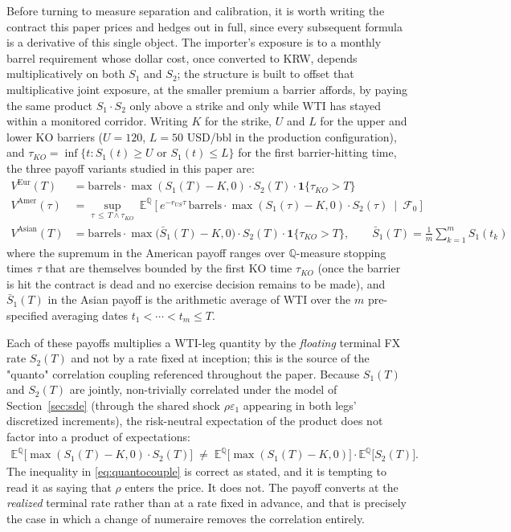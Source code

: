 \documentclass[11pt,a4paper]{article}
\begin{document}
Before turning to measure separation and calibration, it is worth writing the contract this paper prices and hedges out in full, since every subsequent formula is a derivative of this single object. The importer's exposure is to a monthly barrel requirement whose dollar cost, once converted to KRW, depends multiplicatively on both $S_1$ and $S_2$; the structure is built to offset that multiplicative joint exposure, at the smaller premium a barrier affords, by paying the same product $S_1 \cdot S_2$ only above a strike and only while WTI has stayed within a monitored corridor. Writing $K$ for the strike, $U$ and $L$ for the upper and lower KO barriers ($U=120$, $L=50$ USD/bbl in the production configuration), and $\tau_{KO}=\inf\{t : S_1(t)\ge U \text{ or } S_1(t)\le L\}$ for the first barrier-hitting time, the three payoff variants studied in this paper are:
\begin{align}
V^{\text{Eur}}(T) &= \mathrm{barrels}\cdot \max(S_1(T)-K,0)\cdot S_2(T)\cdot\mathbf 1\{\tau_{KO}>T\} \\
V^{\text{Amer}}(\tau) &= \sup_{\tau\,\le\, T\wedge\tau_{KO}}\ \mathbb E^{\mathbb Q}\!\left[e^{-r_{US}\tau}\,\mathrm{barrels}\cdot\max(S_1(\tau)-K,0)\cdot S_2(\tau)\ \middle|\ \mathcal F_0\right] \\
V^{\text{Asian}}(T) &= \mathrm{barrels}\cdot \max\!\big(\bar S_1(T)-K,0\big)\cdot S_2(T)\cdot\mathbf 1\{\tau_{KO}>T\}, \qquad \bar S_1(T) = \frac{1}{m}\sum_{k=1}^{m} S_1(t_k)
\end{align}
where the supremum in the American payoff ranges over $\mathbb Q$-measure stopping times $\tau$ that are themselves bounded by the first KO time $\tau_{KO}$ (once the barrier is hit the contract is dead and no exercise decision remains to be made), and $\bar S_1(T)$ in the Asian payoff is the arithmetic average of WTI over the $m$ pre-specified averaging dates $t_1<\cdots<t_m\le T$.

Each of these payoffs multiplies a WTI-leg quantity by the \emph{floating} terminal FX rate $S_2(T)$ and not by a rate fixed at inception; this is the source of the "quanto" correlation coupling referenced throughout the paper. Because $S_1(T)$ and $S_2(T)$ are jointly, non-trivially correlated under the model of Section~\ref{sec:sde} (through the shared shock $\rho\varepsilon_1$ appearing in both legs' discretized increments), the risk-neutral expectation of the product does not factor into a product of expectations:
\begin{align}
\mathbb E^{\mathbb Q}\!\big[\max(S_1(T)-K,0)\cdot S_2(T)\big] \;\ne\; \mathbb E^{\mathbb Q}\!\big[\max(S_1(T)-K,0)\big]\cdot \mathbb E^{\mathbb Q}\!\big[S_2(T)\big].
\label{eq:quantocouple}
\end{align}
The inequality in \eqref{eq:quantocouple} is correct as stated, and it is tempting to read it as saying that $\rho$ enters the price. It does not. The payoff converts at the \emph{realized} terminal rate rather than at a rate fixed in advance, and that is precisely the case in which a change of numeraire removes the correlation entirely.
\end{document}
